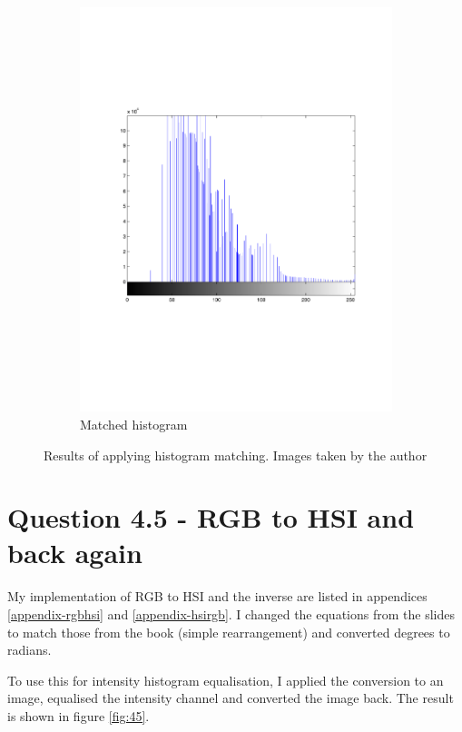 \documentclass[a4paper]{article}
\begin{document}
\begin{figure}[ht]
\begin{subfigure}[b]{0.3\textwidth}
                \includegraphics[width=\textwidth]{q4-c-thist}
                \caption{Matched histogram}
                \label{fig:ahe2}
        \end{subfigure}
        \caption{Results of applying histogram matching. Images taken by the author}
        \label{fig:442compare}
\end{figure}

\section*{Question 4.5 - RGB to HSI and back again} 

My implementation of RGB to HSI and the inverse are listed in appendices \ref{appendix-rgbhsi} and \ref{appendix-hsirgb}. I changed the equations from the slides to match those from the book (simple rearrangement) and converted degrees to radians.

To use this for intensity histogram equalisation, I applied the conversion to an image, equalised the intensity channel and converted the image back. The result is shown in figure \ref{fig:45}.
\end{document}
